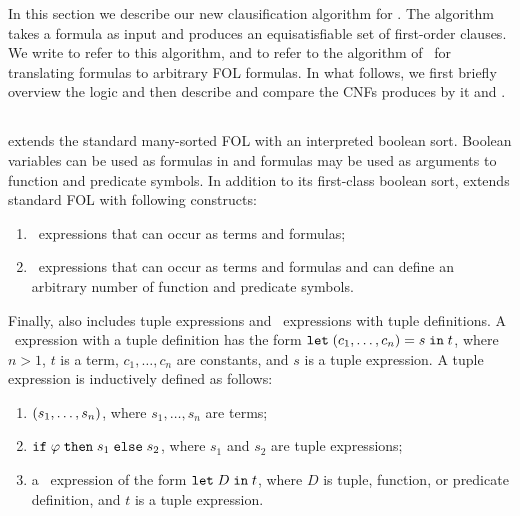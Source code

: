 
In this section we describe our new clausification algorithm for \folb{}. 
The algorithm takes a \folb{} formula as input and produces an equisatisfiable set of first-order clauses. 
We write \nfcnf{} to refer to this algorithm, and \oldcnf{} to refer to the algorithm of~\cite{FOOL} for translating \folb{} formulas to arbitrary FOL formulas. In what follows, we first briefly overview the \folb{} logic and then describe \nfcnf{} and compare the CNFs produces by it and \oldcnf{}.

\subsection{\folb{}}

\folb{} \cite{FOOL} extends the standard many-sorted FOL with an interpreted boolean sort. 
Boolean variables can be used as formulas in \folb{} and formulas may be used as
arguments to function and predicate symbols. In addition to its first-class boolean sort,
\folb{} extends standard FOL with following constructs:
\begin{enumerate}
  \item \ITE\ expressions that can occur as terms and formulas;
  \item \LETIN\ expressions that can occur as terms and formulas and can define an arbitrary number of function and predicate symbols.
\end{enumerate}
Finally, \folb{} also includes tuple expressions and \LETIN\ expressions with tuple definitions. 
A \LETIN\ expression with a tuple definition has the form $\mathtt{let}\;{({c_1,\ldots,c_n})}={s}\;\allowbreak\mathtt{in}\;{t}$, where $n > 1$, $t$ is a term, $c_1,\ldots,c_n$ are constants, and $s$ is a tuple expression. A tuple expression is inductively defined as follows:
\begin{enumerate}
  \item $({s_1,\ldots,s_n})$, where $s_1,\ldots,s_n$ are terms;
  \item $\mathtt{if}\;{\varphi}\;\allowbreak\mathtt{then}\;{s_1}\;\allowbreak\mathtt{else}\;{s_2}$, where $s_1$ and $s_2$ are tuple expressions;
  \item a \LETIN\ expression of the form $\mathtt{let}\;{D}\;\allowbreak\mathtt{in}\;{t}$, where $D$ is tuple, function, or predicate definition, and $t$ is a tuple expression.
\end{enumerate}

